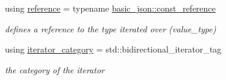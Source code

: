 \begin{DoxyCompactItemize}
using \hyperlink{classnlohmann_1_1basic__json_1_1const__iterator_aefd248cac6493eed1e6ff53ba6a63eb2}{reference} = typename \hyperlink{classnlohmann_1_1basic__json_af677a29b0e66edc9f66e5167e4667071}{basic\+\_\+json\+::const\+\_\+reference}
\begin{DoxyCompactList}\small\item\em defines a reference to the type iterated over (value\+\_\+type) \end{DoxyCompactList}\item 
\mbox{\label{classnlohmann_1_1basic__json_1_1const__iterator_a821560d64f50525162097f19b1392e7f}} 
using \hyperlink{classnlohmann_1_1basic__json_1_1const__iterator_a821560d64f50525162097f19b1392e7f}{iterator\+\_\+category} = std\+::bidirectional\+\_\+iterator\+\_\+tag
\begin{DoxyCompactList}\small\item\em the category of the iterator \end{DoxyCompactList}\end{DoxyCompactItemize}
